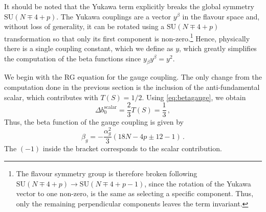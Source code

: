 It should be noted that the Yukawa term explicitly breaks the global symmetry $\mathrm{SU}(N\mp 4+p)$. The Yukawa couplings are a vector $y^\beta$ in the flavour space and, without loss of generality, it can be rotated using a $\mathrm{SU}(N\mp4+p)$ transformation so that only its first component is non-zero.\footnote{The flavour symmetry group is therefore broken following $\mathrm{SU}(N\mp4+p) \to \mathrm{SU}(N\mp 4+p-1)$, since the rotation of the Yukawa vector to one non-zero, is the same as selecting a specific component. Thus, only the remaining perpendicular components leaves the term invariant. } Hence, physically there is a single coupling constant, which we define as $y$, which greatly simplifies the computation of the beta functions since $y_\beta y^\beta=y^2$.

We begin with the RG equation for the gauge coupling. The only change from the computation done in the previous section is the inclusion of the anti-fundamental scalar, which contributes with $T(S) = 1/2$. Using \eqref{eq:betagauge}, we obtain 
\begin{equation}
\Delta b_0^{\text{scalar}} =  \frac{2}{3} T(S) =  \frac{1}{3}\,,\label{eq:scaleff}
\end{equation}
Thus, the beta function of the gauge coupling is given by
\begin{equation}
    \beta_g=-\frac{\alpha_g^2}{3}\left(18N-4p\pm{12}-1\right)\,.\label{eq:betagwithp}
\end{equation}
 The $(-1)$ inside the bracket corresponds to the scalar contribution.

